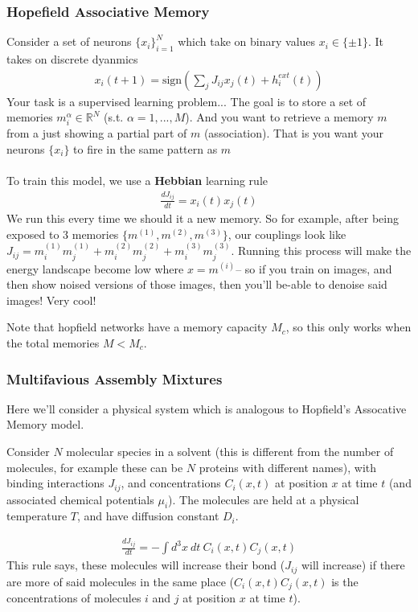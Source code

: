 \subsubsection{Hopefield Associative Memory}
Consider a set of neurons $\{x_i\}^N_{i=1}$ which take on binary values $x_i \in \{\pm 1\}$.  It takes on discrete dyanmics
\begin{align}
	x_i(t+1) = \text{sign}\left(\sum_j J_{ij} x_j(t) + h_i^{ext}(t) 
\right)
\end{align}
Your task is a supervised learning problem... The goal is to store a set of memories $m_i^\alpha \in \mathbb R^N$ (s.t. $\alpha = 1,..., M$). And you want to retrieve a memory $m$ from a just showing a partial part of $m$ (association). That is you want your neurons $\{x_i\}$ to fire in the same pattern as $m$ \\
\\
To train this model, we use a \textbf{Hebbian} learning rule
\begin{align}
	\frac{dJ_{ij}}{dt} = x_i (t) x_j(t)
\end{align}
We run this every time we should it a new memory. So for example, after being exposed to 3 memories $\{m^{(1)}, m^{(2)}, m^{(3)}\}$, our couplings look like $J_{ij} = m_i^{(1)} m_j^{(1)} + m_i^{(2)} m_j^{(2)} + m_i^{(3)} m_j^{(3)}$. Running this process will make the energy landscape become low where $x = m^{(i)}$-- so if you train on images, and then show noised versions of those images, then you'll be-able to denoise said images! Very cool! 

Note that hopfield networks have a memory capacity $M_c$, so this only works when the total memories $M < M_c$.

\subsubsection{Multifavious Assembly Mixtures}
Here we'll consider a physical system which is analogous to Hopfield's Assocative Memory model.

Consider $N$ molecular species in a solvent (this is different from the number of molecules, for example these can be $N$ proteins with different names), with binding interactions $J_{ij}$, and concentrations $C_i(x,t)$ at position $x$ at time $t$ (and associated chemical potentials $\mu_i$). The molecules are held at a physical temperature $T$, and have diffusion constant $D_i$.

\begin{align}
	\frac{dJ_{ij}}{dt} = - \int d^3x ~dt ~ C_i(x,t) C_j(x,t)
\end{align}
This rule says, these molecules will increase their bond ($J_{ij}$ will increase) if there are more of said molecules in the same place ($C_i(x,t) C_j(x,t)$ is the concentrations of molecules $i$ and $j$ at position $x$ at time $t$).

